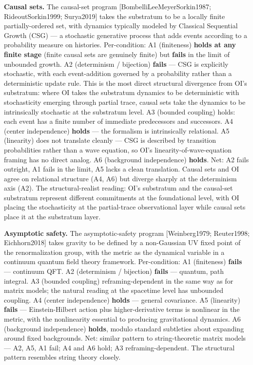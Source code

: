 \documentclass[
]{article}
\begin{document}
\textbf{Causal sets.} The causal-set program
{[}BombelliLeeMeyerSorkin1987; RideoutSorkin1999; Surya2019{]} takes the
substratum to be a locally finite partially-ordered set, with dynamics
typically modeled by Classical Sequential Growth (CSG) --- a stochastic
generative process that adds events according to a probability measure
on histories. Per-condition: A1 (finiteness) \textbf{holds at any finite
stage} (finite causal sets are genuinely finite) but \textbf{fails} in
the limit of unbounded growth. A2 (determinism / bijection)
\textbf{fails} --- CSG is explicitly stochastic, with each
event-addition governed by a probability rather than a deterministic
update rule. This is the most direct structural divergence from OI's
substratum: where OI takes the substratum dynamics to be deterministic
with stochasticity emerging through partial trace, causal sets take the
dynamics to be intrinsically stochastic at the substratum level. A3
(bounded coupling) holds: each event has a finite number of immediate
predecessors and successors. A4 (center independence) \textbf{holds} ---
the formalism is intrinsically relational. A5 (linearity) does not
translate cleanly --- CSG is described by transition probabilities
rather than a wave equation, so OI's linearity-of-wave-equation framing
has no direct analog. A6 (background independence) \textbf{holds}. Net:
A2 fails outright, A1 fails in the limit, A5 lacks a clean translation.
Causal sets and OI agree on relational structure (A4, A6) but diverge
sharply at the determinism axis (A2). The structural-realist reading:
OI's substratum and the causal-set substratum represent different
commitments at the foundational level, with OI placing the stochasticity
at the partial-trace observational layer while causal sets place it at
the substratum layer.

\textbf{Asymptotic safety.} The asymptotic-safety program
{[}Weinberg1979; Reuter1998; Eichhorn2018{]} takes gravity to be defined
by a non-Gaussian UV fixed point of the renormalization group, with the
metric as the dynamical variable in a continuum quantum field theory
framework. Per-condition: A1 (finiteness) \textbf{fails} --- continuum
QFT. A2 (determinism / bijection) \textbf{fails} --- quantum, path
integral. A3 (bounded coupling) reframing-dependent in the same way as
for matrix models; the natural reading at the spacetime level has
unbounded coupling. A4 (center independence) \textbf{holds} --- general
covariance. A5 (linearity) \textbf{fails} --- Einstein-Hilbert action
plus higher-derivative terms is nonlinear in the metric, with the
nonlinearity essential to producing gravitational dynamics. A6
(background independence) \textbf{holds}, modulo standard subtleties
about expanding around fixed backgrounds. Net: similar pattern to
string-theoretic matrix models --- A2, A5, A1 fail; A4 and A6 hold; A3
reframing-dependent. The structural pattern resembles string theory
closely.
\end{document}
